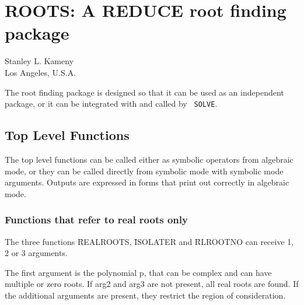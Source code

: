 \chapter{ROOTS: A REDUCE root finding package}
\label{ROOTS}

{\footnotesize
\begin{center}
Stanley L. Kameny \\
Los Angeles, U.S.A.
\end{center}
}

The root finding package is designed so that it can be used as an
independent package, or it can be integrated with and called by {\tt
SOLVE}.

\section{Top Level Functions}

The top level functions can be called either as symbolic operators from
algebraic mode, or they can be called directly from symbolic mode with
symbolic mode arguments.  Outputs are expressed in forms that print out
correctly in algebraic mode.


\subsection{Functions that refer to real roots only}

The three functions \f{REALROOTS}, \f{ISOLATER} and \f{RLROOTNO} can
receive 1, 2 or 3 arguments.

The first argument is the polynomial p, that can be complex and can
have multiple or zero roots.  If arg2 and arg3 are not present, all real
roots are found.  If the additional arguments are present, they restrict
the region of consideration.

